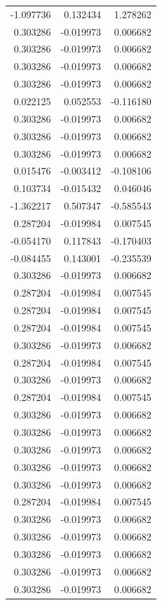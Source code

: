 \documentclass[a4paper,twoside,12pt]{book}
\begin{document}
\begin{appendices}
\begin{table}
\begin{tabular}{rrr}
	-1.097736 &  0.132434 &  1.278262 \\
	 0.303286 & -0.019973 &  0.006682 \\
	 0.303286 & -0.019973 &  0.006682 \\
	 0.303286 & -0.019973 &  0.006682 \\
	 0.303286 & -0.019973 &  0.006682 \\
	 0.022125 &  0.052553 & -0.116180 \\
	 0.303286 & -0.019973 &  0.006682 \\
	 0.303286 & -0.019973 &  0.006682 \\
	 0.303286 & -0.019973 &  0.006682 \\
	 0.015476 & -0.003412 & -0.108106 \\
	 0.103734 & -0.015432 &  0.046046 \\
	-1.362217 &  0.507347 & -0.585543 \\
	 0.287204 & -0.019984 &  0.007545 \\
	-0.054170 &  0.117843 & -0.170403 \\
	-0.084455 &  0.143001 & -0.235539 \\
	 0.303286 & -0.019973 &  0.006682 \\
	 0.287204 & -0.019984 &  0.007545 \\
	 0.287204 & -0.019984 &  0.007545 \\
	 0.287204 & -0.019984 &  0.007545 \\
	 0.303286 & -0.019973 &  0.006682 \\
	 0.287204 & -0.019984 &  0.007545 \\
	 0.303286 & -0.019973 &  0.006682 \\
	 0.287204 & -0.019984 &  0.007545 \\
	 0.303286 & -0.019973 &  0.006682 \\
	 0.303286 & -0.019973 &  0.006682 \\
	 0.303286 & -0.019973 &  0.006682 \\
	 0.303286 & -0.019973 &  0.006682 \\
	 0.303286 & -0.019973 &  0.006682 \\
	 0.287204 & -0.019984 &  0.007545 \\
	 0.303286 & -0.019973 &  0.006682 \\
	 0.303286 & -0.019973 &  0.006682 \\
	 0.303286 & -0.019973 &  0.006682 \\
	 0.303286 & -0.019973 &  0.006682 \\
	 0.303286 & -0.019973 &  0.006682 \\

\end{tabular}
\end{table}
\end{appendices}
\end{document}
